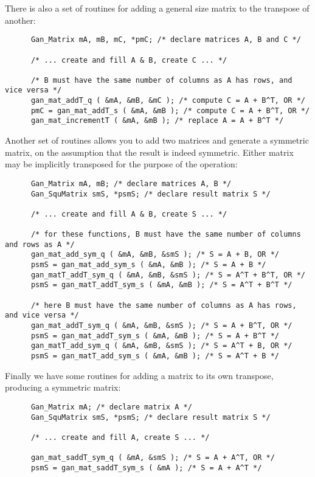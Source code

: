 There is also a set of routines for adding a general size matrix to the
transpose of another:
\begin{verbatim}
      Gan_Matrix mA, mB, mC, *pmC; /* declare matrices A, B and C */

      /* ... create and fill A & B, create C ... */

      /* B must have the same number of columns as A has rows, and vice versa */
      gan_mat_addT_q ( &mA, &mB, &mC ); /* compute C = A + B^T, OR */
      pmC = gan_mat_addT_s ( &mA, &mB ); /* compute C = A + B^T, OR */
      gan_mat_incrementT ( &mA, &mB ); /* replace A = A + B^T */
\end{verbatim}

Another set of routines allows you to add two matrices and generate a
symmetric matrix, on the assumption that the result is indeed symmetric.
Either matrix may be implicitly transposed for the purpose of the operation:
\begin{verbatim}
      Gan_Matrix mA, mB; /* declare matrices A, B */
      Gan_SquMatrix smS, *psmS; /* declare result matrix S */

      /* ... create and fill A & B, create S ... */

      /* for these functions, B must have the same number of columns and rows as A */
      gan_mat_add_sym_q ( &mA, &mB, &smS ); /* S = A + B, OR */
      psmS = gan_mat_add_sym_s ( &mA, &mB ); /* S = A + B */
      gan_matT_addT_sym_q ( &mA, &mB, &smS ); /* S = A^T + B^T, OR */
      psmS = gan_matT_addT_sym_s ( &mA, &mB ); /* S = A^T + B^T */

      /* here B must have the same number of columns as A has rows, and vice versa */
      gan_mat_addT_sym_q ( &mA, &mB, &smS ); /* S = A + B^T, OR */
      psmS = gan_mat_addT_sym_s ( &mA, &mB ); /* S = A + B^T */
      gan_matT_add_sym_q ( &mA, &mB, &smS ); /* S = A^T + B, OR */
      psmS = gan_matT_add_sym_s ( &mA, &mB ); /* S = A^T + B */
\end{verbatim}

Finally we have some routines for adding a matrix to its own transpose,
producing a symmetric matrix:
\begin{verbatim}
      Gan_Matrix mA; /* declare matrix A */
      Gan_SquMatrix smS, *psmS; /* declare result matrix S */

      /* ... create and fill A, create S ... */

      gan_mat_saddT_sym_q ( &mA, &smS ); /* S = A + A^T, OR */
      psmS = gan_mat_saddT_sym_s ( &mA ); /* S = A + A^T */
\end{verbatim}

